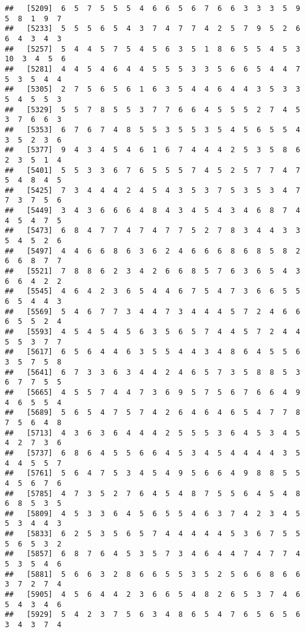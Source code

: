 \documentclass[
]{book}
\begin{document}
\begin{verbatim}
##   [5209]  6  5  7  5  5  5  4  6  6  5  6  7  6  6  3  3  3  5  9  5  8  1  9  7
##   [5233]  5  5  5  6  5  4  3  7  4  7  7  4  2  5  7  9  5  2  6  6  4  3  4  3
##   [5257]  5  4  4  5  7  5  4  5  6  3  5  1  8  6  5  5  4  5  3 10  3  4  5  6
##   [5281]  4  4  5  4  6  4  4  5  5  5  3  3  5  6  6  5  4  4  7  5  3  5  4  4
##   [5305]  2  7  5  6  5  6  1  6  3  5  4  4  6  4  4  3  5  3  3  5  4  5  5  3
##   [5329]  5  5  7  8  5  5  3  7  7  6  6  4  5  5  5  2  7  4  5  3  7  6  6  3
##   [5353]  6  7  6  7  4  8  5  5  3  5  5  3  5  4  5  6  5  5  4  3  5  2  3  6
##   [5377]  9  4  3  4  5  4  6  1  6  7  4  4  4  2  5  3  5  8  6  2  3  5  1  4
##   [5401]  5  5  3  3  6  7  6  5  5  5  7  4  5  2  5  7  7  4  7  5  4  8  4  5
##   [5425]  7  3  4  4  4  2  4  5  4  3  5  3  7  5  3  5  3  4  7  7  3  7  5  6
##   [5449]  3  4  3  6  6  6  4  8  4  3  4  5  4  3  4  6  8  7  4  4  5  4  7  5
##   [5473]  6  8  4  7  7  4  7  4  7  7  5  2  7  8  3  4  4  3  3  5  4  5  2  6
##   [5497]  4  4  6  6  8  6  3  6  2  4  6  6  6  8  6  8  5  8  2  6  6  8  7  7
##   [5521]  7  8  8  6  2  3  4  2  6  6  8  5  7  6  3  6  5  4  3  6  6  4  2  2
##   [5545]  4  6  4  2  3  6  5  4  4  6  7  5  4  7  3  6  6  5  5  6  5  4  4  3
##   [5569]  5  4  6  7  7  3  4  4  7  3  4  4  4  5  7  2  4  6  6  6  5  5  2  4
##   [5593]  4  5  4  5  4  5  6  3  5  6  5  7  4  4  5  7  2  4  4  5  5  3  7  7
##   [5617]  6  5  6  4  4  6  3  5  5  4  4  3  4  8  6  4  5  5  6  3  5  7  5  8
##   [5641]  6  7  3  3  6  3  4  4  2  4  6  5  7  3  5  8  8  5  3  6  7  7  5  5
##   [5665]  4  5  5  7  4  4  7  3  6  9  5  7  5  6  7  6  6  4  9  4  6  5  5  4
##   [5689]  5  6  5  4  7  5  7  4  2  6  4  6  4  6  5  4  7  7  8  7  5  6  4  8
##   [5713]  4  3  6  3  6  4  4  4  2  5  5  5  3  6  4  5  3  4  5  4  2  7  3  6
##   [5737]  6  8  6  4  5  5  6  6  4  5  3  4  5  4  4  4  4  3  5  4  4  5  5  7
##   [5761]  5  6  4  7  5  3  4  5  4  9  5  6  6  4  9  8  8  5  5  4  5  6  7  6
##   [5785]  4  7  3  5  2  7  6  4  5  4  8  7  5  5  6  4  5  4  8  6  8  5  3  5
##   [5809]  4  5  3  3  6  4  5  6  5  5  4  6  3  7  4  2  3  4  5  5  3  4  4  3
##   [5833]  6  2  5  3  5  6  5  7  4  4  4  4  4  5  3  6  7  5  5  5  6  5  3  2
##   [5857]  6  8  7  6  4  5  3  5  7  3  4  6  4  4  7  4  7  7  4  5  3  5  4  6
##   [5881]  5  6  6  3  2  8  6  6  5  5  3  5  2  5  6  6  8  6  6  3  7  2  7  4
##   [5905]  4  5  6  4  4  2  3  6  6  5  4  8  2  6  5  3  7  4  6  5  4  3  4  6
##   [5929]  5  4  2  3  7  5  6  3  4  8  6  5  4  7  6  5  6  5  6  3  4  3  7  4

\end{verbatim}
\end{document}
